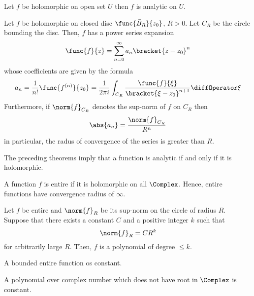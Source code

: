  \begin{theorem}
     Let \(f\) be holomorphic on open set \(U\) then \(f\) is analytic on \(U\).
 \end{theorem}

 \begin{theorem}
     Let \(f\) be holomorphic on closed disc \(\func{\bar{B}_R}{z_0}\), \(R > 0\). Let \(C_R\) be the circle bounding the disc. Then, \(f\) has a power series expansion 
     \begin{equation*}
         \func{f}{z} = \sum_{n = 0}^{\infty} a_n \bracket{z - z_0 }^n
     \end{equation*}
     whose coefficients are given by the formula 
     \begin{equation*}
         a_n = \dfrac{1}{n!} \func{f^{(n)}}{z_0} = \dfrac{1}{2 \pi i} \int_{C_R} \frac{\func{f}{\xi}}{\bracket{\xi - z_0}^{n+1}} \diffOperator \xi
     \end{equation*}
     Furthermore, if \(\norm{f}_{C_R}\) denotes the sup-norm of \(f\) on \(C_R\) then 
     \begin{equation*}
       \abs{a_n} = \dfrac{\norm{f}_{C_R}}{R^n}  
    \end{equation*}
    in particular, the radus of convergence of the series is greater than \(R\).
 \end{theorem}
 The preceding theorems imply that a function is analytic if and only if it is holomorphic.

 \begin{definition}
     A function \(f\) is entire if it is holomorphic on all \(\Complex\). Hence, entire functions have convergence radius of \(\infty\).
 \end{definition}

 \begin{corollary}
     Let \(f\) be entire and \(\norm{f}_R\) be its sup-norm on the circle of radius \(R\). Suppose that there exists a constant \(C\) and a positive integer \(k\) such that 
     \begin{equation*}
         \norm{f}_R = CR^k
     \end{equation*}
     for arbitrarily large \(R\). Then, \(f\) is a polynomial of degree \(\leq k\).
 \end{corollary}

 \begin{theorem}
     A bounded entire function os constant.
 \end{theorem}

 \begin{corollary}
     A polynomial over complex number which does not have root in \(\Complex\) is constant.
 \end{corollary}

